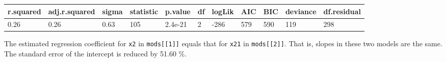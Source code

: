 \begin{table}[H]
\centering
\begin{tabular}{lllllllllll}
\toprule
r.squared & adj.r.squared & sigma & statistic & p.value & df & logLik & AIC & BIC & deviance & df.residual\\
\midrule
0.26 & 0.26 & 0.63 & 105 & 2.4e-21 & 2 & -286 & 579 & 590 & 119 & 298\\
\bottomrule
\end{tabular}
\end{table}

The estimated regression coefficient for \texttt{x2} in
\texttt{mods{[}{[}1{]}{]}} equals that for \texttt{x21} in
\texttt{mods{[}{[}2{]}{]}}. That is, slopes in these two models are the
same. The standard error of the intercept is reduced by 51.60 \%.
